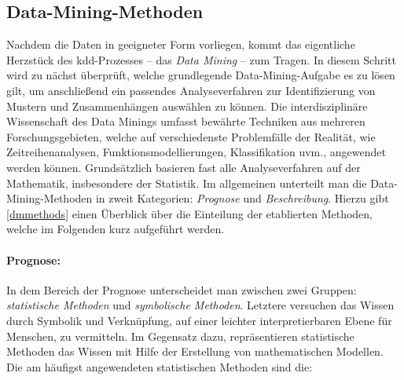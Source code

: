 \subsection{Data-Mining-Methoden}
\label{dmmethoden}

Nachdem die Daten in geeigneter Form vorliegen, kommt das eigentliche Herzstück des \gls{kdd}-Prozesses -- das \textit{Data Mining} -- zum Tragen. In diesem Schritt wird zu nächst überprüft, welche grundlegende Data-Mining-Aufgabe es zu lösen gilt, um anschließend ein passendes Analyseverfahren zur Identifizierung von Mustern und Zusammenhängen auswählen zu können. Die interdisziplinäre Wissenschaft des Data Minings umfasst bewährte Techniken aus mehreren Forschungsgebieten, welche auf verschiedenste Problemfälle der Realität, wie Zeitreihenanalysen, Funktionsmodellierungen, Klassifikation uvm., angewendet werden können. Grundsätzlich basieren fast alle Analyseverfahren auf der Mathematik, insbesondere der Statistik. Im allgemeinen unterteilt man die Data-Mining-Methoden in zweit Kategorien: \textit{Prognose} und \textit{Beschreibung}. Hierzu gibt \vref{dmmethods} einen Überblick über die Einteilung der etablierten Methoden, welche im Folgenden kurz aufgeführt werden.

\paragraph{Prognose:} In dem Bereich der Prognose unterscheidet man zwischen zwei Gruppen: \textit{statistische Methoden} und \textit{symbolische Methoden}. Letztere versuchen das Wissen durch Symbolik und Verknüpfung, auf einer leichter interpretierbaren Ebene für Menschen, zu vermitteln. Im Gegensatz dazu, repräsentieren statistische Methoden das Wissen mit Hilfe der Erstellung von mathematischen Modellen. Die am häufigst angewendeten statistischen Methoden sind die:

